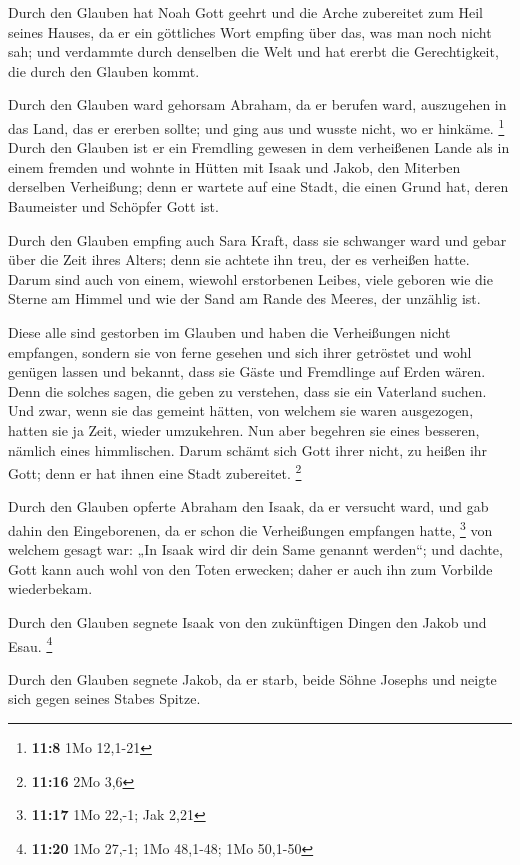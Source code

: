  Durch den Glauben hat Noah Gott geehrt und die Arche
zubereitet zum Heil seines Hauses, da er ein göttliches Wort empfing
über das, was man noch nicht sah; und verdammte durch denselben die Welt
und hat ererbt die Gerechtigkeit, die durch den Glauben kommt.

 Durch den Glauben ward gehorsam Abraham, da er berufen
ward, auszugehen in das Land, das er ererben sollte; und ging aus und
wusste nicht, wo er hinkäme. \footnote{\textbf{11:8} 1Mo 12,1-21}
 Durch den Glauben ist er ein Fremdling gewesen in dem
verheißenen Lande als in einem fremden und wohnte in Hütten mit Isaak
und Jakob, den Miterben derselben Verheißung;  denn er
wartete auf eine Stadt, die einen Grund hat, deren Baumeister und
Schöpfer Gott ist.

 Durch den Glauben empfing auch Sara Kraft, dass sie
schwanger ward und gebar über die Zeit ihres Alters; denn sie achtete
ihn treu, der es verheißen hatte.  Darum sind auch von
einem, wiewohl erstorbenen Leibes, viele geboren wie die Sterne am
Himmel und wie der Sand am Rande des Meeres, der unzählig ist.

 Diese alle sind gestorben im Glauben und haben die
Verheißungen nicht empfangen, sondern sie von ferne gesehen und sich
ihrer getröstet und wohl genügen lassen und bekannt, dass sie Gäste und
Fremdlinge auf Erden wären.  Denn die solches sagen, die
geben zu verstehen, dass sie ein Vaterland suchen.  Und
zwar, wenn sie das gemeint hätten, von welchem sie waren ausgezogen,
hatten sie ja Zeit, wieder umzukehren.  Nun aber begehren
sie eines besseren, nämlich eines himmlischen. Darum schämt sich Gott
ihrer nicht, zu heißen ihr Gott; denn er hat ihnen eine Stadt
zubereitet. \footnote{\textbf{11:16} 2Mo 3,6}

 Durch den Glauben opferte Abraham den Isaak, da er
versucht ward, und gab dahin den Eingeborenen, da er schon die
Verheißungen empfangen hatte, \footnote{\textbf{11:17} 1Mo 22,-1; Jak
  2,21}  von welchem gesagt war: „In Isaak wird dir dein
Same genannt werden``;  und dachte, Gott kann auch wohl
von den Toten erwecken; daher er auch ihn zum Vorbilde wiederbekam.

 Durch den Glauben segnete Isaak von den zukünftigen
Dingen den Jakob und Esau. \footnote{\textbf{11:20} 1Mo 27,-1; 1Mo
  48,1-48; 1Mo 50,1-50}

 Durch den Glauben segnete Jakob, da er starb, beide
Söhne Josephs und neigte sich gegen seines Stabes Spitze.

